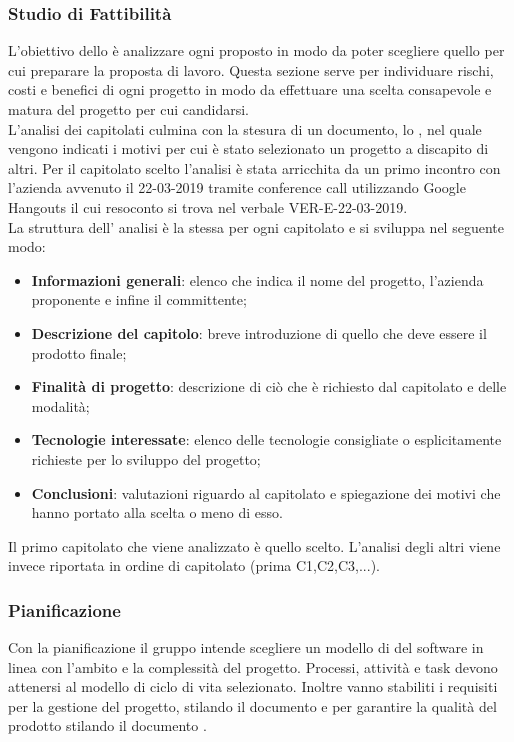 \subsubsection{Studio di Fattibilità} 
L'obiettivo dello \docNameSdF{} è analizzare ogni  proposto in modo
da poter scegliere quello per cui preparare la proposta di lavoro. Questa sezione serve per 
individuare rischi, costi e benefici di ogni progetto in modo da effettuare una scelta consapevole e matura del 
progetto per cui candidarsi. \\
L'analisi dei capitolati culmina con la stesura di un documento,
lo \docNameVersionSdF{}, nel quale vengono indicati i motivi per cui è stato selezionato un 
progetto a discapito di altri. Per il capitolato scelto l'analisi è stata arricchita da un primo
incontro con l'azienda \proposerName{} avvenuto il 22-03-2019 tramite conference call utilizzando Google Hangouts il cui resoconto si trova
nel verbale VER-E-22-03-2019. \\
La struttura dell' analisi è la stessa per ogni capitolato e si sviluppa nel seguente modo:
\begin{itemize} 
    \item \textbf{Informazioni generali}: elenco che indica il nome del progetto, l'azienda proponente e infine il committente;
    \item \textbf{Descrizione del capitolo}: breve introduzione di quello che deve essere il prodotto finale;
    \item \textbf{Finalità di progetto}: descrizione di ciò che è richiesto dal capitolato e delle modalità;
    \item \textbf{Tecnologie interessate}: elenco delle tecnologie consigliate o esplicitamente richieste per lo sviluppo del progetto;
    \item \textbf{Conclusioni}: valutazioni riguardo al capitolato e spiegazione dei motivi che hanno portato alla scelta o meno di esso.
\end{itemize}
Il primo capitolato che viene analizzato è quello scelto. L'analisi degli altri viene invece riportata
in ordine di capitolato (prima C1,C2,C3,...).

\subsubsection{Pianificazione}
Con la pianificazione il gruppo intende scegliere un modello di  del software
in linea con l'ambito e la complessità del progetto. Processi, attività e task devono attenersi al modello
di ciclo di vita selezionato. Inoltre vanno stabiliti i requisiti per la gestione del progetto, stilando
il documento \docNameVersionPdP{} e per garantire la qualità del prodotto stilando il documento
\docNameVersionPdQ{}.

